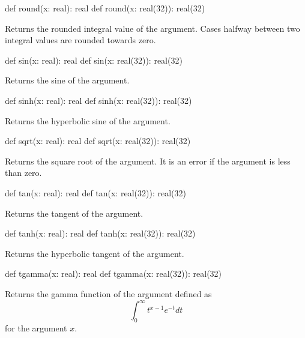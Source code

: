 \begin{protohead}
def round(x: real): real
def round(x: real(32)): real(32)
\end{protohead}
\begin{protobody}
Returns the rounded integral value of the argument.  Cases halfway
between two integral values are rounded towards zero.
\end{protobody}

\begin{protohead}
def sin(x: real): real
def sin(x: real(32)): real(32)
\end{protohead}
\begin{protobody}
Returns the sine of the argument.
\end{protobody}

\begin{protohead}
def sinh(x: real): real
def sinh(x: real(32)): real(32)
\end{protohead}
\begin{protobody}
Returns the hyperbolic sine of the argument.
\end{protobody}

\begin{protohead}
def sqrt(x: real): real
def sqrt(x: real(32)): real(32)
\end{protohead}
\begin{protobody}
Returns the square root of the argument.  It is an error if the
argument is less than zero.
\end{protobody}

\begin{protohead}
def tan(x: real): real
def tan(x: real(32)): real(32)
\end{protohead}
\begin{protobody}
Returns the tangent of the argument.
\end{protobody}

\begin{protohead}
def tanh(x: real): real
def tanh(x: real(32)): real(32)
\end{protohead}
\begin{protobody}
Returns the hyperbolic tangent of the argument.
\end{protobody}

\begin{protohead}
def tgamma(x: real): real
def tgamma(x: real(32)): real(32)
\end{protohead}
\begin{protobody}
Returns the gamma function of the argument defined as
$$\int_0^\infty t^{x-1} e^{-t} dt$$
for the argument $x$.
\end{protobody}


